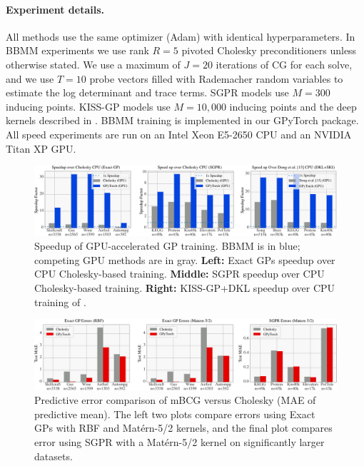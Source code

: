 \paragraph{Experiment details.} All methods use the same optimizer (Adam) with identical hyperparameters.
In BBMM experiments we use rank $R\!=\!5$ pivoted Cholesky preconditioners unless otherwise stated.
We use a maximum of $J\!=\!20$ iterations of CG for each solve, and
we use $T\!=\!10$ probe vectors filled with Rademacher random variables to estimate the log determinant and trace terms.
SGPR models use $M\!=\!300$ inducing points.
KISS-GP models use $M\!=\!10,\!000$ inducing points and the deep kernels described in \cite{wilson2016deep}.
BBMM training is implemented in our GPyTorch package.
All speed experiments are run on an Intel Xeon E5-2650 CPU and an NVIDIA Titan XP GPU.

\begin{figure}[t]
  \centering
  \includegraphics[width=\textwidth]{figures/sparse_gp_results}
  \caption[Speedup of GPU-accelerated GP training.]{
    Speedup of GPU-accelerated GP training.
    BBMM is in blue; competing GPU methods are in gray.
    {\bf Left:} Exact GPs speedup over CPU Cholesky-based training.
    {\bf Middle:} SGPR \cite{titsias2009variational,hensman2013gaussian} speedup over CPU Cholesky-based training.
    {\bf Right:} KISS-GP+DKL \cite{wilson2015kernel,wilson2016deep} speedup over CPU training of \citet{dong2017scalable}.
    \label{fig:timing_results}
  }
\end{figure}
%
\begin{figure}[t]
  \centering
  \includegraphics[width=\textwidth]{figures/exact_gp_chol_vs_mvm}
  \caption[Predictive error comparison of mBCG versus Cholesky.]{
		Predictive error comparison of mBCG versus Cholesky (MAE of predictive mean).
		The left two plots compare errors using Exact GPs with RBF and Mat\'ern-5/2 kernels,
		and the final plot compares error using SGPR with a Mat\'ern-5/2 kernel on significantly larger datasets.
	}
  \label{fig:bbmm_error_results}
\end{figure}

